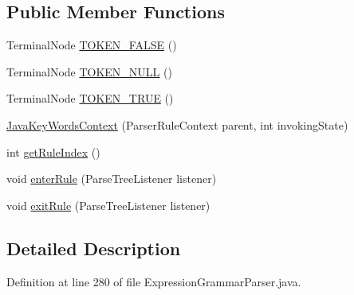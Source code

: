 \subsection*{Public Member Functions}
\begin{DoxyCompactItemize}
\item 
Terminal\+Node \hyperlink{classgov_1_1nasa_1_1jpf_1_1inspector_1_1server_1_1expression_1_1parser_1_1_expression_grammar_parser_1_1_java_key_words_context_a0603c9e1c742d0a93ae996c78518bd31}{T\+O\+K\+E\+N\+\_\+\+F\+A\+L\+SE} ()
\item 
Terminal\+Node \hyperlink{classgov_1_1nasa_1_1jpf_1_1inspector_1_1server_1_1expression_1_1parser_1_1_expression_grammar_parser_1_1_java_key_words_context_a10c55d2a492bc8ea97e510216739f5b3}{T\+O\+K\+E\+N\+\_\+\+N\+U\+LL} ()
\item 
Terminal\+Node \hyperlink{classgov_1_1nasa_1_1jpf_1_1inspector_1_1server_1_1expression_1_1parser_1_1_expression_grammar_parser_1_1_java_key_words_context_a821fae1eda0c2ea7cdf280ecb54dd16e}{T\+O\+K\+E\+N\+\_\+\+T\+R\+UE} ()
\item 
\hyperlink{classgov_1_1nasa_1_1jpf_1_1inspector_1_1server_1_1expression_1_1parser_1_1_expression_grammar_parser_1_1_java_key_words_context_a19dd34b8db61c905e0ddad8a8a27440f}{Java\+Key\+Words\+Context} (Parser\+Rule\+Context parent, int invoking\+State)
\item 
int \hyperlink{classgov_1_1nasa_1_1jpf_1_1inspector_1_1server_1_1expression_1_1parser_1_1_expression_grammar_parser_1_1_java_key_words_context_ab1840eb79f0f69facab90d5c117e4d82}{get\+Rule\+Index} ()
\item 
void \hyperlink{classgov_1_1nasa_1_1jpf_1_1inspector_1_1server_1_1expression_1_1parser_1_1_expression_grammar_parser_1_1_java_key_words_context_a54d0df56fec11ef967f076a5ad85ef44}{enter\+Rule} (Parse\+Tree\+Listener listener)
\item 
void \hyperlink{classgov_1_1nasa_1_1jpf_1_1inspector_1_1server_1_1expression_1_1parser_1_1_expression_grammar_parser_1_1_java_key_words_context_aa68779d9a655b71dc008255217e5b4f0}{exit\+Rule} (Parse\+Tree\+Listener listener)
\end{DoxyCompactItemize}


\subsection{Detailed Description}


Definition at line 280 of file Expression\+Grammar\+Parser.\+java.



